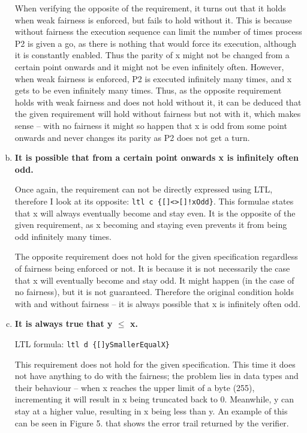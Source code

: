 \documentclass{report}
\begin{document}
\begin{enumerate}[(a)]
When verifying the opposite of the requirement, it turns out that it holds when weak fairness is enforced, but fails to hold without it. This is because without fairness the execution sequence can limit the number of times process P2 is given a go, as there is nothing that would force its execution, although it is constantly enabled. Thus the parity of x might not be changed from a certain point onwards and it might not be even infinitely often. However, when weak fairness is enforced, P2 is executed infinitely many times, and x gets to be even infinitely many times. Thus, as the opposite requirement holds with weak fairness and does not hold without it, it can be deduced that the given requirement will hold without fairness but not with it, which makes sense -- with no fairness it might so happen that x is odd from some point onwards and never changes its parity as P2 does not get a turn.

\item \textbf{It is possible that from a certain point onwards x is infinitely often odd.}

Once again, the requirement can not be directly expressed using LTL, therefore I look at its opposite: \texttt{ltl c \{[]<>[]!xOdd\}}. This formulae states that x will always eventually become and stay even. It is the opposite of the given requirement, as x becoming and staying even prevents it from being odd infinitely many times.

The opposite requirement does not hold for the given specification regardless of fairness being enforced or not. It is because it is not necessarily the case that x will eventually become and stay odd. It might happen (in the case of no fairness), but it is not guaranteed. Therefore the original condition holds with and without fairness -- it is always possible that x is infinitely often odd.

\item \textbf{It is always true that y $\leq$ x.}

LTL formula: \texttt{ltl d \{[]ySmallerEqualX\}}

This requirement does not hold for the given specification. This time it does not have anything to do with the fairness; the problem lies in data types and their behaviour -- when x reaches the upper limit of a byte (255), incrementing it will result in x being truncated back to 0. Meanwhile, y can stay at a higher value, resulting in x being less than y. An example of this can be seen in Figure 5. that shows the error trail returned by the verifier.


\end{enumerate}
\end{document}
